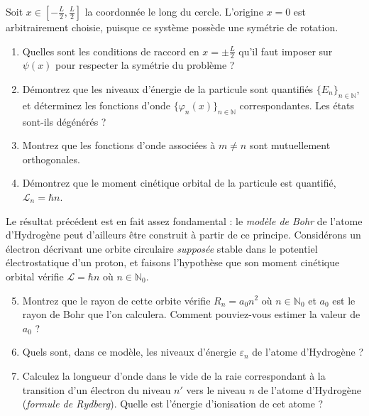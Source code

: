 \begin{center}
\end{center}
$ $\\
Soit $x \in [-\frac{L}{2},\frac{L}{2}]$ la coordonnée le long du cercle. L'origine $x=0$ est arbitrairement choisie, puisque ce système possède une symétrie de rotation.

\begin{enumerate}
    \item Quelles sont les conditions de raccord en $x= \pm \frac{L}{2}$ qu'il faut imposer sur $\psi(x)$ pour respecter la symétrie du problème ?
    \item Démontrez que les niveaux d'énergie de la particule sont quantifiés $\lbrace E_n\rbrace_{n\in\mathbb N}$, et déterminez les fonctions d'onde $\lbrace \varphi_n(x)\rbrace_{n\in\mathbb N}$ correspondantes. Les états sont-ils dégénérés ?
    \item Montrez que les fonctions d'onde associées à $m\neq n$ sont mutuellement orthogonales.
    \item Démontrez que le moment cinétique orbital de la particule est quantifié, $\mathcal L_n = \hbar n$.
    \end{enumerate}
    Le résultat précédent est en fait assez fondamental : le \textit{modèle de Bohr} de l'atome d'Hydrogène peut d'ailleurs être construit à partir de ce principe. Considérons un électron décrivant une orbite circulaire \textit{supposée} stable dans le potentiel électrostatique d'un proton, et faisons l'hypothèse que son moment cinétique orbital vérifie $\mathcal L = \hbar n$ où $n\in \mathbb N_0$. 
    \begin{enumerate}
    \setcounter{enumi}{4}
    \item Montrez que le rayon de cette orbite vérifie $R_n = a_0 n^2$ où $n\in\mathbb N_0$ et $a_0$ est le rayon de Bohr que l'on calculera. Comment pouviez-vous estimer la valeur de $a_0$ ?
    \item Quels sont, dans ce modèle, les niveaux d'énergie $\varepsilon_n$ de l'atome d'Hydrogène ? 
    \item Calculez la longueur d'onde dans le vide de la raie correspondant à la transition d'un électron du niveau $n'$ vers le niveau $n$ de l'atome d'Hydrogène (\textit{formule de Rydberg}). Quelle est l'énergie d'ionisation de cet atome ? 
\end{enumerate}

